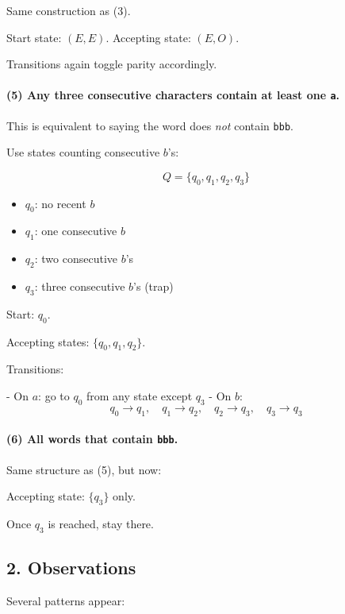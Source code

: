 \documentclass{article}
\theoremstyle{theorem}
\theoremstyle{definition}
\theoremstyle{remark}
\begin{document}
Same construction as (3).

Start state: $(E,E)$.  
Accepting state: $(E,O)$.

Transitions again toggle parity accordingly.

\bigskip

\paragraph{(5) Any three consecutive characters contain at least one \texttt{a}.}

This is equivalent to saying the word does \emph{not} contain \texttt{bbb}.

Use states counting consecutive $b$'s:

\[
Q = \{q_0,q_1,q_2,q_3\}
\]

\begin{itemize}
\item $q_0$: no recent $b$
\item $q_1$: one consecutive $b$
\item $q_2$: two consecutive $b$'s
\item $q_3$: three consecutive $b$'s (trap)
\end{itemize}

Start: $q_0$.

Accepting states: $\{q_0,q_1,q_2\}$.

Transitions:

- On $a$: go to $q_0$ from any state except $q_3$
- On $b$:
  \[
  q_0 \to q_1,\quad
  q_1 \to q_2,\quad
  q_2 \to q_3,\quad
  q_3 \to q_3
  \]

\bigskip

\paragraph{(6) All words that contain \texttt{bbb}.}

Same structure as (5), but now:

Accepting state: $\{q_3\}$ only.

Once $q_3$ is reached, stay there.

\bigskip

\subsection*{2. Observations}

Several patterns appear:
\end{document}
